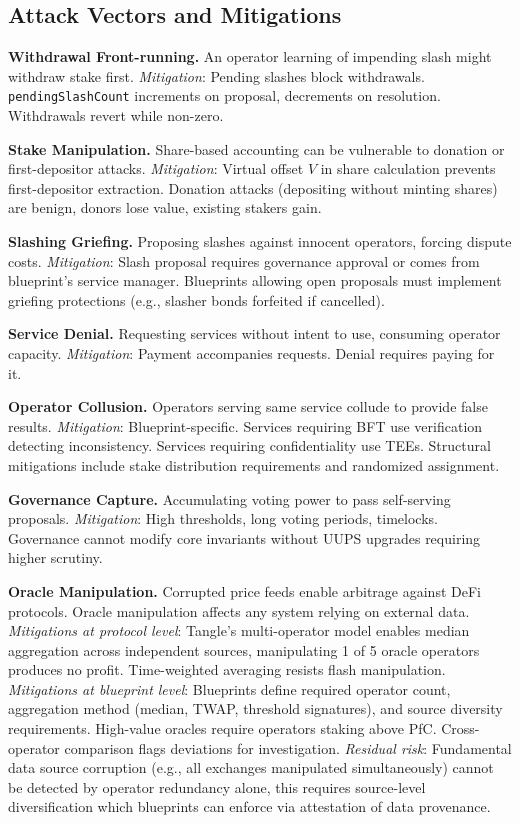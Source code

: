 \documentclass[11pt,a4paper]{article}
\begin{document}
\subsection{Attack Vectors and Mitigations}

\textbf{Withdrawal Front-running.} An operator learning of impending slash might withdraw stake first. \textit{Mitigation}: Pending slashes block withdrawals. \texttt{pendingSlashCount} increments on proposal, decrements on resolution. Withdrawals revert while non-zero.

\textbf{Stake Manipulation.} Share-based accounting can be vulnerable to donation or first-depositor attacks. \textit{Mitigation}: Virtual offset $V$ in share calculation prevents first-depositor extraction. Donation attacks (depositing without minting shares) are benign, donors lose value, existing stakers gain.

\textbf{Slashing Griefing.} Proposing slashes against innocent operators, forcing dispute costs. \textit{Mitigation}: Slash proposal requires governance approval or comes from blueprint's service manager. Blueprints allowing open proposals must implement griefing protections (e.g., slasher bonds forfeited if cancelled).

\textbf{Service Denial.} Requesting services without intent to use, consuming operator capacity. \textit{Mitigation}: Payment accompanies requests. Denial requires paying for it.

\textbf{Operator Collusion.} Operators serving same service collude to provide false results. \textit{Mitigation}: Blueprint-specific. Services requiring BFT use verification detecting inconsistency. Services requiring confidentiality use TEEs. Structural mitigations include stake distribution requirements and randomized assignment.

\textbf{Governance Capture.} Accumulating voting power to pass self-serving proposals. \textit{Mitigation}: High thresholds, long voting periods, timelocks. Governance cannot modify core invariants without UUPS upgrades requiring higher scrutiny.

\textbf{Oracle Manipulation.} Corrupted price feeds enable arbitrage against DeFi protocols. Oracle manipulation affects any system relying on external data. \textit{Mitigations at protocol level}: Tangle's multi-operator model enables median aggregation across independent sources, manipulating 1 of 5 oracle operators produces no profit. Time-weighted averaging resists flash manipulation. \textit{Mitigations at blueprint level}: Blueprints define required operator count, aggregation method (median, TWAP, threshold signatures), and source diversity requirements. High-value oracles require operators staking above PfC. Cross-operator comparison flags deviations for investigation. \textit{Residual risk}: Fundamental data source corruption (e.g., all exchanges manipulated simultaneously) cannot be detected by operator redundancy alone, this requires source-level diversification which blueprints can enforce via attestation of data provenance.
\end{document}
